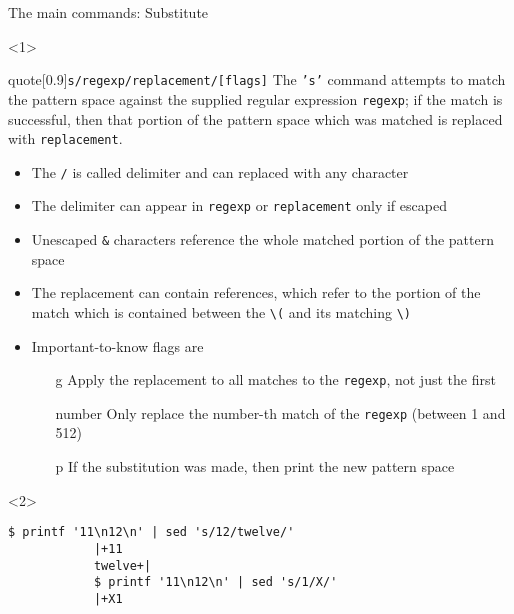 \begin{frame}[fragile]{The main commands: Substitute}
    \vspace{-2mm}
    \begin{onlyenv}<1>
        \begin{varblock}{quote}[0.9\textwidth]{\texttt{s/regexp/replacement/[flags]}}
            \textnormal{The \texttt{'s'} command attempts to match the pattern space against the supplied regular expression \texttt{regexp};
            if the match is successful, then that portion of the pattern space which was matched is replaced with \texttt{replacement}.}
        \end{varblock}
        \begin{itemize}
            \item The \texttt{/} is called delimiter and can replaced with any character
            \item The delimiter can appear in \texttt{regexp} or \texttt{replacement} only if escaped
            \item Unescaped \alert{\texttt{\&}} characters reference \alert{the whole matched portion of the pattern space}
            \item The replacement can contain  references,
                  which refer to the portion of the match which is contained between the  \texttt{\textbackslash(} and its matching \texttt{\textbackslash)}
            \item Important-to-know flags are
                  \begin{itemize}
                      \item[g] Apply the replacement to all matches to the \texttt{regexp}, not just the first
                      \item[number] Only replace the number-th match of the \texttt{regexp} (between 1 and 512)
                      \item[p] If the substitution was made, then print the new pattern space
                  \end{itemize}
        \end{itemize}
    \end{onlyenv}
    \begin{onlyenv}<2>
        \begin{lstlisting}[style=MyBash]
            $ printf '11\n12\n' | sed 's/12/twelve/'
            |+11
            twelve+|
            $ printf '11\n12\n' | sed 's/1/X/'
            |+X1

\end{lstlisting}
\end{onlyenv}
\end{frame}

